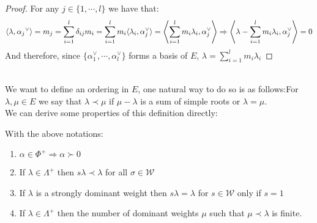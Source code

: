 \begin{proof}
For any $j \in \{1,\cdots,l\}$ we have that:
$$\langle {\lambda},{\alpha_j}^\lor\rangle = m_j = \sum_{i=1}^l \delta_{ij}m_i = \sum_{i=1}^l m_i\langle  \lambda_i, \alpha_j^\lor \rangle = \left\langle \sum_{i=1}^l m_i\lambda_i, \alpha_j^\lor \right\rangle \Rightarrow \left\langle \lambda - \sum_{i=1}^l m_i\lambda_i,\alpha_j^\lor \right\rangle = 0$$
And therefore, since $\{\alpha_1^\lor, \cdots, \alpha_l^\lor\}$ forms a basis of $E$, $\lambda=\displaystyle\sum_{i=1}^l m_i\lambda_i$
\end{proof}\\
We want to define an ordering in $E$, one natural way to do so is as follows:For $\lambda,\mu \in E$ we say that $\lambda \prec \mu$ if $\mu - \lambda$ is a sum of simple roots or $\lambda = \mu$.\\
We can derive some properties of this definition directly:
\begin{lema}
	With the above notations:
	\begin{enumerate}
		\item $\alpha \in \Phi^+ \Rightarrow \alpha \succ 0$
		\item If $\lambda \in \Lambda^+$ then $s \lambda \prec \lambda$ for all $\sigma \in \mathcal{W}$
		\item If $\lambda$ is a strongly dominant weight then $s \lambda = \lambda$ for $s \in \mathcal{W}$ only if $s = 1$ 
		\item If $\lambda \in \Lambda^+$ then the number of dominant weights $\mu$ such that $\mu \prec \lambda$ is finite.
	\end{enumerate}
	\label{33orderingproperties}
\end{lema}
